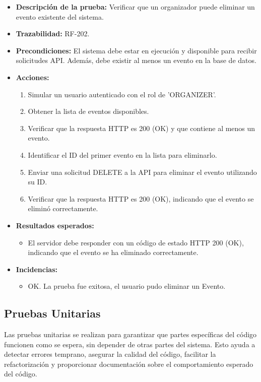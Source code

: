 \begin{itemize}
    \item \textbf{Descripción de la prueba:} Verificar que un organizador puede eliminar un evento existente del sistema.
    \item \textbf{Trazabilidad:} RF-202.
    \item \textbf{Precondiciones:} El sistema debe estar en ejecución y disponible para recibir solicitudes API. Además, debe existir al menos un evento en la base de datos.
    \item \textbf{Acciones:}
    \begin{enumerate}
        \item Simular un usuario autenticado con el rol de 'ORGANIZER'.
        \item Obtener la lista de eventos disponibles.
        \item Verificar que la respuesta HTTP es 200 (OK) y que contiene al menos un evento.
        \item Identificar el ID del primer evento en la lista para eliminarlo.
        \item Enviar una solicitud DELETE a la API para eliminar el evento utilizando su ID.
        \item Verificar que la respuesta HTTP es 200 (OK), indicando que el evento se eliminó correctamente.
    \end{enumerate}
    \item \textbf{Resultados esperados:}
    \begin{itemize}
        \item El servidor debe responder con un código de estado HTTP 200 (OK), indicando que el evento se ha eliminado correctamente.
    \end{itemize}
    \item \textbf{Incidencias:}
    \begin{itemize}
        \item OK. La prueba fue exitosa, el usuario pudo eliminar un Evento.
    \end{itemize}
\end{itemize}


\subsection{Pruebas Unitarias}
Las pruebas unitarias se realizan para garantizar que partes específicas del código funcionen como se espera, sin depender de otras partes del sistema. 
Esto ayuda a detectar errores temprano, asegurar la calidad del código, facilitar la refactorización y proporcionar documentación sobre el comportamiento esperado del 
código.

